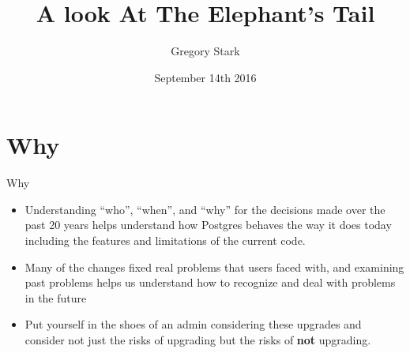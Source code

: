 \documentclass{beamer}
\title{A look At The Elephant's Tail}
\author{Gregory Stark}
\date{September 14th 2016}
\begin{document}
\begin{frame}[plain]
  \titlepage
\end{frame}

\section{Why}
\begin{frame}{Why}
  \begin{itemize}%
  \item Understanding ``who'', ``when'', and ``why'' for the decisions made
    over the past 20 years helps understand how Postgres behaves the way
    it does today including the features and limitations of the current
    code.
  \item Many of the changes fixed real problems that users faced with,
    and examining past problems helps us understand how to recognize and
    deal with problems in the future
  \item Put yourself in the shoes of an admin considering these upgrades
    and consider not just the risks of upgrading but the risks of
    \textbf{not} upgrading.
  \end{itemize}
\end{frame}
\end{document}
